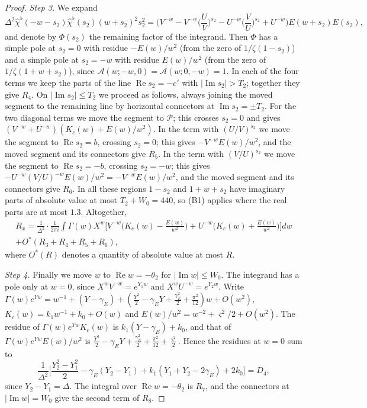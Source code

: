 \documentclass[11pt]{amsart}
\numberwithin{equation}{section}
\theoremstyle{definition}
\theoremstyle{remark}
\newcommand{\Rp}{\operatorname{Re}}
\newcommand{\Ip}{\operatorname{Im}}
\begin{document}
\begin{proof}
\emph{Step 3.}
We expand
\[
\Delta^2\hat\chi^\flat(-w-s_2)\hat\chi^\flat(s_2)(w + s_2)^2s_2^2 = \Big(V^{-w} - V^{-w}\Big(\frac UV\Big)^{s_2} - U^{-w}\Big(\frac VU\Big)^{s_2} + U^{-w}\Big)E(w + s_2)E(s_2),
\]
and denote by $\Phi(s_2)$ the remaining factor of the integrand.
Then $\Phi$ has a simple pole at $s_2 = 0$ with residue $-E(w)/w^2$ (from the zero of $1/\zeta(1 - s_2)$) and a simple pole at $s_2 = -w$ with residue $E(w)/w^2$ (from the zero of $1/\zeta(1 + w + s_2)$), since $\mathcal A(w; -w, 0) = \mathcal A(w; 0, -w) = 1$.
In each of the four terms we keep the parts of the line $\Rp s_2 = -c'$ with $|\Ip s_2| > T_2$; together they give $R_4$.
On $|\Ip s_2| \leq T_2$ we proceed as follows, always joining the moved segment to the remaining line by horizontal connectors at $\Ip s_2 = \pm T_2$.
For the two diagonal terms we move the segment to $\mathcal P$; this crosses $s_2 = 0$ and gives $(V^{-w} + U^{-w})(K_c(w) + E(w)/w^2)$.
In the term with $(U/V)^{s_2}$ we move the segment to $\Rp s_2 = b$, crossing $s_2 = 0$; this gives $-V^{-w}E(w)/w^2$, and the moved segment and its connectors give $R_5$.
In the term with $(V/U)^{s_2}$ we move the segment to $\Rp s_2 = -b$, crossing $s_2 = -w$; this gives $-U^{-w}(V/U)^{-w}E(w)/w^2 = -V^{-w}E(w)/w^2$, and the moved segment and its connectors give $R_6$.
In all these regions $1 - s_2$ and $1 + w + s_2$ have imaginary parts of absolute value at most $T_2 + W_0 = 440$, so (B1) applies where the real parts are at most $1.3$.
Altogether,
\begin{multline*}
R_x = \frac1{\Delta^2}\cdot\frac1{2\pi i}\int\Gamma(w)X^w\Big[V^{-w}\Big(K_c(w) - \frac{E(w)}{w^2}\Big) + U^{-w}\Big(K_c(w) + \frac{E(w)}{w^2}\Big)\Big]dw\\
+ O^*(R_3 + R_4 + R_5 + R_6),
\end{multline*}
where $O^*(R)$ denotes a quantity of absolute value at most $R$.

\emph{Step 4.}
Finally we move $w$ to $\Rp w = -\theta_2$ for $|\Ip w| \leq W_0$.
The integrand has a pole only at $w = 0$, since $X^wV^{-w} = e^{Y_1w}$ and $X^wU^{-w} = e^{Y_2w}$.
Write $\Gamma(w)e^{Yw} = w^{-1} + (Y - \gamma_E) + (\frac{Y^2}2 - \gamma_EY + \frac{\gamma_E^2}2 + \frac{\pi^2}{12})w + O(w^2)$, $K_c(w) = k_1w^{-1} + k_0 + O(w)$ and $E(w)/w^2 = w^{-2} + \varsigma^2/2 + O(w^2)$.
The residue of $\Gamma(w)e^{Yw}K_c(w)$ is $k_1(Y - \gamma_E) + k_0$, and that of $\Gamma(w)e^{Yw}E(w)/w^2$ is $\frac{Y^2}2 - \gamma_EY + \frac{\gamma_E^2}2 + \frac{\pi^2}{12} + \frac{\varsigma^2}2$.
Hence the residues at $w = 0$ sum to
\[
\frac{1}{\Delta^2}\Big[\frac{Y_2^2 - Y_1^2}2 - \gamma_E(Y_2 - Y_1) + k_1(Y_1 + Y_2 - 2\gamma_E) + 2k_0\Big] = D_4,
\]
since $Y_2 - Y_1 = \Delta$.
The integral over $\Rp w = -\theta_2$ is $R_7$, and the connectors at $|\Ip w| = W_0$ give the second term of $R_8$.
\end{proof}
\end{document}
